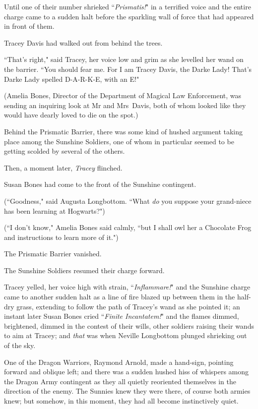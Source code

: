 Until one of their number shrieked ``\emph{Prismatis!}" in a terrified voice and the entire charge came to a sudden halt before the sparkling wall of force that had appeared in front of them.

Tracey Davis had walked out from behind the trees.

``That's right," said Tracey, her voice low and grim as she levelled her wand on the barrier. ``You should fear me. For I am Tracey Davis, the Darke Lady! That's Darke Lady spelled D-A-R-K-E, with an E!"

(Amelia Bones, Director of the Department of Magical Law Enforcement, was sending an inquiring look at Mr and Mrs~Davis, both of whom looked like they would have dearly loved to die on the spot.)

Behind the Prismatic Barrier, there was some kind of hushed argument taking place among the Sunshine Soldiers, one of whom in particular seemed to be getting scolded by several of the others.

Then, a moment later, \emph{Tracey} flinched.

Susan Bones had come to the front of the Sunshine contingent.

(``Goodness," said Augusta Longbottom. ``What \emph{do} you suppose your grand-niece has been learning at Hogwarts?")

(``I don't know," Amelia Bones said calmly, ``but I shall owl her a Chocolate Frog and instructions to learn more of it.")

The Prismatic Barrier vanished.

The Sunshine Soldiers resumed their charge forward.

Tracey yelled, her voice high with strain, ``\emph{Inflammare!}" and the Sunshine charge came to another sudden halt as a line of fire blazed up between them in the half-dry grass, extending to follow the path of Tracey's wand as she pointed it; an instant later Susan Bones cried ``\emph{Finite Incantatem!}" and the flames dimmed, brightened, dimmed in the contest of their wills, other soldiers raising their wands to aim at Tracey; and \emph{that} was when Neville Longbottom plunged shrieking out of the sky.

\later

One of the Dragon Warriors, Raymond Arnold, made a hand-sign, pointing forward and oblique left; and there was a sudden hushed hiss of whispers among the Dragon Army contingent as they all quietly reoriented themselves in the direction of the enemy. The Sunnies knew they were there, of course both armies knew; but somehow, in this moment, they had all become instinctively quiet.

